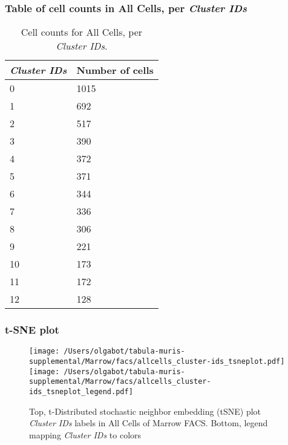 \subsubsection{Table of cell counts in All Cells, per \emph{Cluster IDs}}\begin{table}[h]
\centering
\label{my-label}
\begin{tabular}{@{}ll@{}}
\toprule

\emph{Cluster IDs}& Number of cells \\ \midrule
0 & 1015 \\

1 & 692 \\

2 & 517 \\

3 & 390 \\

4 & 372 \\

5 & 371 \\

6 & 344 \\

7 & 336 \\

8 & 306 \\

9 & 221 \\

10 & 173 \\

11 & 172 \\

12 & 128 \\
\bottomrule
\end{tabular}
\caption{Cell counts for All Cells, per \emph{Cluster IDs}.}
\end{table}

\clearpage
\subsubsection{t-SNE plot}
\begin{figure}[h]
\centering
\texttt{[image: /Users/olgabot/tabula-muris-supplemental/Marrow/facs/allcells\_cluster-ids\_tsneplot.pdf]}
\texttt{[image: /Users/olgabot/tabula-muris-supplemental/Marrow/facs/allcells\_cluster-ids\_tsneplot\_legend.pdf]}
\caption{Top, t-Distributed stochastic neighbor embedding (tSNE) plot  \emph{Cluster IDs} labels in All Cells of Marrow FACS. Bottom, legend mapping \emph{Cluster IDs} to colors}
\end{figure}


